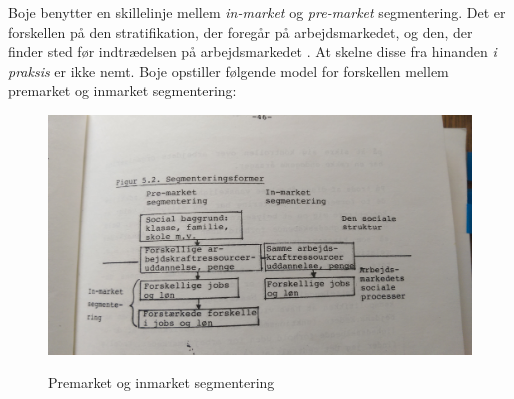 Boje benytter en skillelinje mellem \emph{in-market} og \emph{pre-market} segmentering. Det er forskellen på den stratifikation, der foregår på arbejdsmarkedet, og den, der finder sted før indtrædelsen på arbejdsmarkedet \parencite[46]{Boje1985}. At skelne disse fra hinanden \emph{i praksis} er ikke nemt. Boje opstiller følgende model for forskellen mellem premarket og inmarket segmentering:
%
   \begin{figure}[H]
   \begin{centering}
   	\caption{Premarket og inmarket segmentering}
   	\includegraphics[width=\textwidth]{fig/Boje_premarket_inmarket.jpg}
   	\label{fig_premarketinmarket}
   \end{centering}
   \end{figure}   
%






